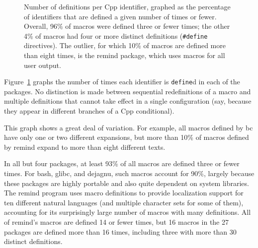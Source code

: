 \documentclass[11pt]{article}
\def\numpackages{27}
\newcommand{\pkg}[1]{\textsf{#1}}
\begin{document}

\begin{figure}
\centerline{}
\caption{Number of definitions per Cpp identifier, graphed as
  the percentage of identifiers that are defined a given number of times
  or fewer.  Overall, 96\% of macros were defined three or
  fewer times; the other 4\% of macros had four or more distinct
  definitions ({\tt \#define} directives).  The outlier, for which 10\% of
  macros are defined more than eight times, is the \pkg{remind}
  package, which uses macros for all user output.}
\label{fig:freq-def}
\end{figure}

Figure~\ref{fig:freq-def} graphs the number of times each identifier is
{\tt define}d in each of the packages.  No distinction is made between
sequential redefinitions of a macro and multiple definitions that cannot
take effect in a single configuration (say, because they appear in
different branches of a Cpp conditional).

This graph shows a great deal of variation.  For example, all macros
defined by \pkg{bc} have only one or two different expansions, but more than 10\%
of macros defined by \pkg{remind} expand to more than eight different texts.

In all but four packages, at least 93\% of all macros are defined three or
fewer times.  For \pkg{bash}, \pkg{glibc}, and \pkg{dejagnu}, such macros account for 90\%,
largely because these packages are highly portable and also quite dependent
on system libraries.  The \pkg{remind} program uses macro definitions to provide
localization support for ten different natural languages (and multiple
character sets for some of them), accounting for its surprisingly large
number of macros with many definitions.  All of \pkg{remind}'s macros are defined
14 or fewer times, but 16 macros in the {\numpackages} packages are defined
more than 16 times, including three with more than 30 distinct definitions.
\end{document}
